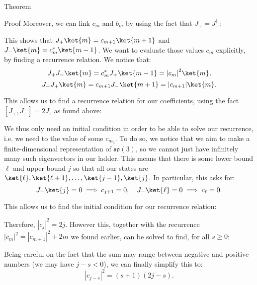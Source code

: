 \documentclass[a4paper]{article}
\begin{document}
\begin{parag}{Theorem}
\begin{subparag}{Proof}
        Moreover, we can link $c_m$ and $b_m$ by using the fact that $J_+ = J_-^{\dagger}$:

        This shows that $J_+ \ket{m} = c_{m+1} \ket{m+1}$ and $J_- \ket{m} = c_m^* \ket{m-1}$. We want to evaluate those values $c_m$ explicitly, by finding a recurrence relation. We notice that: 
        \[J_+ J_- \ket{m} =  c_m^* J_+ \ket{m-1} = \left|c_m\right|^2 \ket{m},\]
        \[J_- J_+ \ket{m} = c_{m+1} J_- \ket{m+1} = \left|c_{m+1}\right| \ket{m}.\]

        This allows us to find a recurrence relation for our coefficients, using the fact $\left[J_+, J_-\right] = 2J_z$ as found above: 

        We thus only need an initial condition in order to be able to solve our recurrence, i.e. we need to the value of some $c_{m_0}$. To do so, we notice that we aim to make a finite-dimensional representation of $\mathfrak{so}\left(3\right)$, so we cannot just have infinitely many such eigenvectors in our ladder. This means that there is some lower bound $\ell$ and upper bound $j$ so that all our states are $\ket{\ell}, \ket{\ell + 1}, \ldots, \ket{j-1}, \ket{j}$. In particular, this asks for: 
        \[J_+\ket{j} = 0 \implies c_{j+1} = 0, \mathspace J_- \ket{\ell} = 0 \implies c_{\ell} = 0.\]

        This allows us to find the initial condition for our recurrence relation: 

        Therefore, $\left|c_j\right|^2 = 2j$. However this, together with the recurrence $\left|c_m\right|^2  = \left|c_{m+1}\right|^2 + 2m$ we found earlier, can be solved to find, for all $s \geq 0$: 

        Being careful on the fact that the sum may range between negative and positive numbers (we may have $j - s < 0$), we can finally simplify this to: 
        \[\left|c_{j-s}\right|^2 = \left(s+1\right)\left(2j - s\right).\]
        

\end{subparag}
\end{parag}
\end{document}

